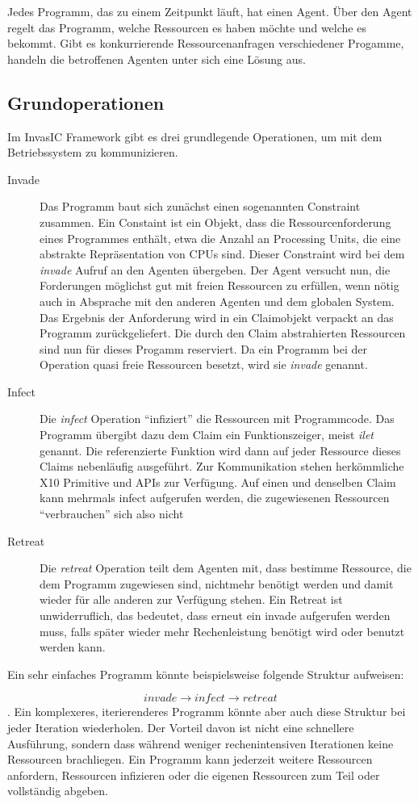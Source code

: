 Jedes Programm, das zu einem Zeitpunkt läuft, hat einen Agent. Über den Agent regelt das Programm, welche Ressourcen es haben möchte und welche es bekommt. Gibt es konkurrierende Ressourcenanfragen verschiedener Progamme, handeln die betroffenen Agenten unter sich eine Lösung aus.
\subsection{Grundoperationen} %
\label{sub:grundoperationen}

Im InvasIC Framework gibt es drei grundlegende Operationen, um mit dem Betriebssystem zu kommunizieren.
\begin{description}
	\item[Invade] Das Programm baut sich zunächst einen sogenannten Constraint zusammen. Ein Constaint ist ein Objekt, dass die Ressourcenforderung eines Programmes enthält, etwa die Anzahl an Processing Units, die eine abstrakte Repräsentation von CPUs sind. Dieser Constraint wird bei dem \textit{invade} Aufruf an den Agenten übergeben. Der Agent versucht nun, die Forderungen möglichst gut mit freien Ressourcen zu erfüllen, wenn nötig auch in Absprache mit den anderen Agenten und dem globalen System. Das Ergebnis der Anforderung wird in ein Claimobjekt verpackt an das Programm zurückgeliefert. Die durch den Claim abstrahierten Ressourcen sind nun für dieses Progamm reserviert. Da ein Programm bei der Operation quasi freie Ressourcen besetzt, wird sie \textit{invade} genannt.
	\item[Infect] Die \textit{infect} Operation \enquote{infiziert} die Ressourcen mit Programmcode. Das Programm übergibt dazu dem Claim ein Funktionszeiger, meist \textit{ilet} genannt. Die referenzierte Funktion wird dann auf jeder Ressource dieses Claims nebenläufig ausgeführt. Zur Kommunikation stehen herkömmliche X10 Primitive und APIs zur Verfügung. Auf einen und denselben Claim kann mehrmals infect aufgerufen werden, die zugewiesenen Ressourcen "`verbrauchen"' sich also nicht
	\item[Retreat] Die \textit{retreat} Operation teilt dem Agenten mit, dass bestimme Ressource, die dem Programm zugewiesen sind, nichtmehr benötigt werden und damit wieder für alle anderen zur Verfügung stehen. Ein Retreat ist unwiderruflich, das bedeutet, dass erneut ein invade aufgerufen werden muss, falls später wieder mehr Rechenleistung benötigt wird oder benutzt werden kann.
\end{description}

Ein sehr einfaches Programm könnte beispielsweise folgende Struktur aufweisen:
\begin{tikzpicture}
	
\end{tikzpicture}
$$\mathit{invade}\rightarrow\mathit{infect}\rightarrow\mathit{retreat}$$.
Ein komplexeres, iterierenderes Programm könnte aber auch diese Struktur bei jeder Iteration wiederholen. Der Vorteil davon ist nicht eine schnellere Ausführung, sondern dass während weniger rechenintensiven Iterationen keine Ressourcen brachliegen. Ein Programm kann jederzeit weitere Ressourcen anfordern, Ressourcen infizieren oder die eigenen Ressourcen zum Teil oder vollständig abgeben. 
